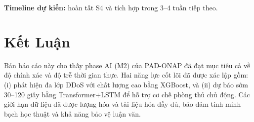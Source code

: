 \documentclass[12pt,a4paper]{article}
\begin{document}
\textbf{Timeline dự kiến:} hoàn tất S4 và tích hợp trong 3--4 tuần tiếp theo.

\section*{Kết Luận}
Bản báo cáo này cho thấy phase AI (M2) của PAD-ONAP đã đạt mục tiêu cả về độ chính xác và độ trễ thời gian thực. Hai năng lực cốt lõi đã được xác lập gồm: (i) phát hiện đa lớp DDoS với chất lượng cao bằng XGBoost, và (ii) dự báo sớm 30--120 giây bằng Transformer+LSTM để hỗ trợ cơ chế phòng thủ chủ động. Các giới hạn dữ liệu đã được lượng hóa và tài liệu hóa đầy đủ, bảo đảm tính minh bạch học thuật và khả năng bảo vệ luận văn.
\end{document}
